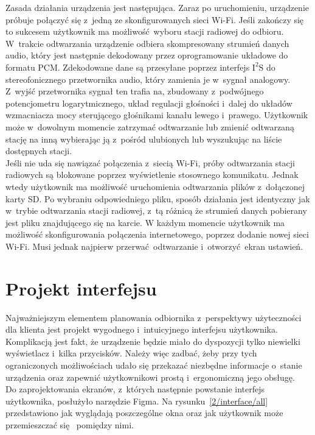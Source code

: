 \documentclass[polish]{aghengthesis}
\newcommand{\isqs}{$\text{I}^{2}\text{S}$}
\begin{document}
			Zasada działania urządzenia jest następująca.
			Zaraz po uruchomieniu, urządzenie próbuje połączyć się z~jedną ze skonfigurowanych sieci Wi-Fi.
			Jeśli zakończy się to sukcesem użytkownik ma możliwość wyboru stacji radiowej do odbioru. W~trakcie odtwarzania urządzenie odbiera skompresowany strumień danych audio, który jest następnie dekodowany przez oprogramowanie układowe do formatu PCM. Zdekodowane dane są przesyłane poprzez interfejs \isqs{} do stereofonicznego przetwornika audio, który zamienia je w~sygnał analogowy. Z~wyjść przetwornika sygnał ten trafia na, zbudowany z~podwójnego potencjometru logarytmicznego, układ regulacji głośności i~dalej do układów wzmacniacza mocy sterującego głośnikami kanału lewego i~prawego.
			Użytkownik może w~dowolnym momencie zatrzymać odtwarzanie lub zmienić odtwarzaną stację na inną wybierając ją z~pośród ulubionych lub wyszukując na liście dostępnych stacji.
			$ $\\
			
			Jeśli nie uda się nawiązać połączenia z~siecią Wi-Fi, próby odtwarzania stacji radiowych są blokowane poprzez wyświetlenie stosownego komunikatu.
			Jednak wtedy użytkownik ma możliwość uruchomienia odtwarzania plików z~dołączonej karty SD. Po wybraniu odpowiedniego pliku, sposób działania jest identyczny jak w~trybie odtwarzania stacji radiowej, z~tą różnicą że strumień danych pobierany jest pliku znajdującego się na karcie. 
			W każdym momencie użytkownik ma możliwość skonfigurowania połączenia internetowego, poprzez dodanie nowej sieci Wi-Fi.
			Musi jednak najpierw przerwać odtwarzanie i~otworzyć ekran ustawień.
	
	\section{Projekt interfejsu}
		\label{sec:ui}
		Najważniejszym elementem planowania odbiornika z~perspektywy użyteczności dla klienta jest projekt wygodnego i~intuicyjnego interfejsu użytkownika. Komplikacją jest fakt, że urządzenie będzie miało do dyspozycji tylko niewielki wyświetlacz i~kilka przycisków.
		Należy więc zadbać, żeby przy tych ograniczonych możliwościach udało się przekazać niezbędne informacje o~stanie urządzenia oraz zapewnić użytkownikowi prostą i~ergonomiczną jego obsługę.
		$ $\\

		Do zaprojektowania ekranów, z~których następnie powstanie interfejs użytkownika, posłużyło narzędzie Figma\textsuperscript{\cite{figma}}. Na rysunku~\ref{2/interface/all} przedstawiono jak wyglądają poszczególne okna oraz jak użytkownik może przemieszczać się  pomiędzy nimi.
		
\end{document}
